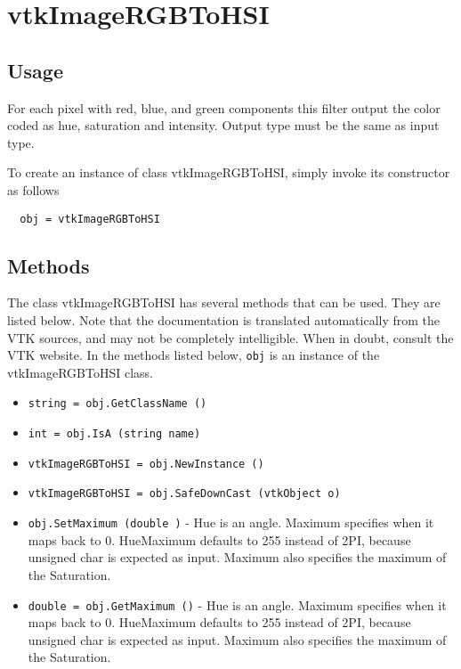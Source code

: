 \section{vtkImageRGBToHSI}

\subsection{Usage}

 For each pixel with red, blue, and green components this
 filter output the color coded as hue, saturation and intensity.
 Output type must be the same as input type.

To create an instance of class vtkImageRGBToHSI, simply
invoke its constructor as follows
\begin{verbatim}
  obj = vtkImageRGBToHSI
\end{verbatim}
\subsection{Methods}

The class vtkImageRGBToHSI has several methods that can be used.
  They are listed below.
Note that the documentation is translated automatically from the VTK sources,
and may not be completely intelligible.  When in doubt, consult the VTK website.
In the methods listed below, \verb|obj| is an instance of the vtkImageRGBToHSI class.
\begin{itemize}
\item  \verb|string = obj.GetClassName ()|

\item  \verb|int = obj.IsA (string name)|

\item  \verb|vtkImageRGBToHSI = obj.NewInstance ()|

\item  \verb|vtkImageRGBToHSI = obj.SafeDownCast (vtkObject o)|

\item  \verb|obj.SetMaximum (double )| -  Hue is an angle. Maximum specifies when it maps back to 0.  HueMaximum
 defaults to 255 instead of 2PI, because unsigned char is expected as
 input.  Maximum also specifies the maximum of the Saturation.

\item  \verb|double = obj.GetMaximum ()| -  Hue is an angle. Maximum specifies when it maps back to 0.  HueMaximum
 defaults to 255 instead of 2PI, because unsigned char is expected as
 input.  Maximum also specifies the maximum of the Saturation.

\end{itemize}
